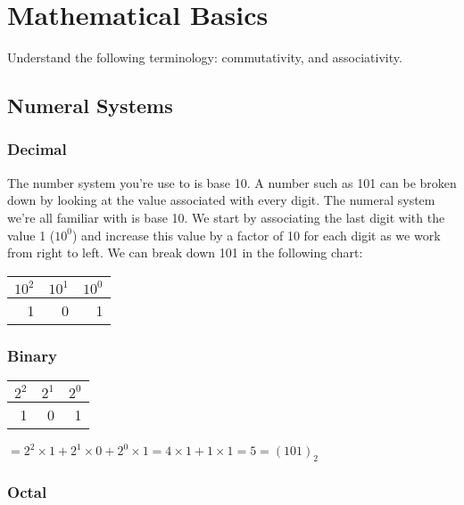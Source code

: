 \chapter{Mathematical Basics}

Understand the following terminology: commutativity, and associativity.

\section{Numeral Systems}

\subsection{Decimal}

The number system you're use to is base 10. A number such as 101 can be broken
down by looking at the value associated with every digit. The numeral system
we're all familiar with is base 10. We start by associating the last digit with
the value 1 ($10^0$) and increase this value by a factor of 10 for each digit
as we work from right to left. We can break down 101 in the following chart:

\begin{center}
  \begin{tabular}{r | r | r}
    $10^2$ & $10^1$ & $10^0$ \\
    \hline
         1 &      0 &      1 \\
  \end{tabular}
\end{center}

\subsection{Binary}

\begin{center}
  \begin{tabular}{r | r | r}
    $2^2$ & $2^1$ & $2^0$ \\
    \hline
        1 &      0 &      1 \\
  \end{tabular}

  \vspace{1em}

  $= 2^2 \times 1 + 2^1 \times 0 + 2^0 \times 1 = 4 \times 1 + 1 \times 1 = 5
   = (101)_2$
\end{center}

\subsection{Octal}

